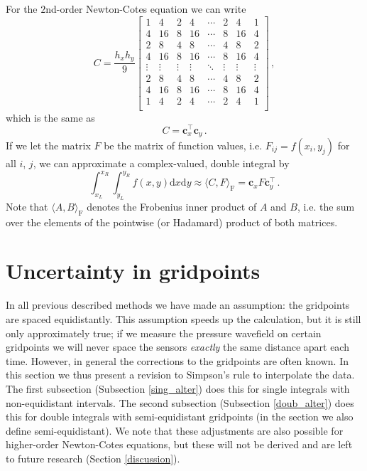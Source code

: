 For the $2$nd-order Newton-Cotes equation we can write
\begin{equation}
    C = \frac{h_x h_y}{9}
    \begin{bmatrix}
        1&4&2&4&\cdots & 2&4&1 \\
        4&16&8&16&\cdots & 8&16&4 \\
        2&8&4&8&\cdots & 4&8&2 \\
        4&16&8&16&\cdots & 8&16&4 \\
        \vdots&\vdots&\vdots&\vdots&\ddots&\vdots&\vdots&\vdots\\
        2&8&4&8&\cdots & 4&8&2 \\
        4&16&8&16&\cdots & 8&16&4 \\
        1&4&2&4&\cdots & 2&4&1 \\
    \end{bmatrix} \,,\nonumber
\end{equation}
which is the same as
\begin{equation}
    C = \mathbf c_x^\top \mathbf c_y \,. \nonumber
\end{equation}
If we let the matrix $F$ be the matrix of function values, i.e. $F_{ij} = f(x_i, y_j)$ for all $i$, $j$, we can approximate a complex-valued, double integral by
\begin{equation}
    \int_{x_L}^{x_R} \int_{y_L}^{y_R} f(x, y) \mathrm d x \mathrm d y \approx \langle C, F \rangle_{\mathrm F} = \mathbf c_x F \mathbf c_y^\top \,.\nonumber
\end{equation}
Note that $\langle A, B \rangle_{\mathrm F}$ denotes the Frobenius inner product of $A$ and $B$, i.e. the sum over the elements of the pointwise (or Hadamard) product of both matrices.

\section{Uncertainty in gridpoints}
In all previous described methods we have made an assumption: the gridpoints are spaced equidistantly.
This assumption speeds up the calculation, but it is still only approximately true; if we measure the pressure wavefield on certain gridpoints we will never space the sensors \textit{exactly} the same distance apart each time.
However, in general the corrections to the gridpoints are often known.
In this section we thus present a revision to Simpson's rule to interpolate the data.
The first subsection (Subsection \ref{sing_alter}) does this for single integrals with non-equidistant intervals.
The second subsection (Subsection \ref{doub_alter}) does this for double integrals with semi-equidistant gridpoints (in the section we also define semi-equidistant).
We note that these adjustments are also possible for higher-order Newton-Cotes equations, but these will not be derived and are left to future research (Section \ref{discussion}).



